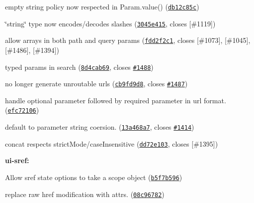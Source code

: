 {{{{\begin{DoxyItemize}
\begin{DoxyItemize}
\item empty string policy now respected in Param.\+value() (\href{https://github.com/angular-ui/ui-router/commit/db12c85c16f2d105415f9bbbdeb11863f64728e0}{\tt db12c85c})
\item \char`\"{}string\char`\"{} type now encodes/decodes slashes (\href{https://github.com/angular-ui/ui-router/commit/3045e41577a8b8b8afc6039f42adddf5f3c061ec}{\tt 3045e415}, closes \mbox{[}\#1119\mbox{]})
\item allow arrays in both path and query params (\href{https://github.com/angular-ui/ui-router/commit/fdd2f2c191c4a67c874fdb9ec9a34f8dde9ad180}{\tt fdd2f2c1}, closes \mbox{[}\#1073\mbox{]}, \mbox{[}\#1045\mbox{]}, \mbox{[}\#1486\mbox{]}, \mbox{[}\#1394\mbox{]})
\item typed params in search (\href{https://github.com/angular-ui/ui-router/commit/8d4cab69dd67058e1a716892cc37b7d80a57037f}{\tt 8d4cab69}, closes \href{https://github.com/angular-ui/ui-router/issues/1488}{\tt \#1488})
\item no longer generate unroutable urls (\href{https://github.com/angular-ui/ui-router/commit/cb9fd9d8943cb26c7223f6990db29c82ae8740f8}{\tt cb9fd9d8}, closes \href{https://github.com/angular-ui/ui-router/issues/1487}{\tt \#1487})
\item handle optional parameter followed by required parameter in url format. (\href{https://github.com/angular-ui/ui-router/commit/efc72106ddcc4774b48ea176a505ef9e95193b41}{\tt efc72106})
\item default to parameter string coersion. (\href{https://github.com/angular-ui/ui-router/commit/13a468a7d54c2fb0751b94c0c1841d580b71e6dc}{\tt 13a468a7}, closes \href{https://github.com/angular-ui/ui-router/issues/1414}{\tt \#1414})
\item concat respects strict\+Mode/case\+Insensitive (\href{https://github.com/angular-ui/ui-router/commit/dd72e103edb342d9cf802816fe127e1bbd68fd5f}{\tt dd72e103}, closes \mbox{[}\#1395\mbox{]})
\end{DoxyItemize}
\item {\bfseries ui-\/sref\+:}
\begin{DoxyItemize}
\item Allow sref state options to take a scope object (\href{https://github.com/angular-ui/ui-router/commit/b5f7b59692ce4933e2d63eb5df3f50a4ba68ccc0}{\tt b5f7b596})
\item replace raw href modification with attrs. (\href{https://github.com/angular-ui/ui-router/commit/08c96782faf881b0c7ab00afc233ee6729548fa0}{\tt 08c96782})

\end{DoxyItemize}
\end{DoxyItemize}}}}}
